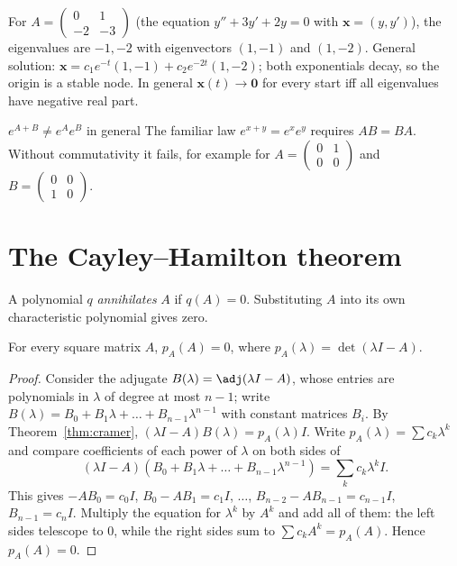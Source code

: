 \begin{example}
For $A=\begin{pmatrix}0&1\\-2&-3\end{pmatrix}$ (the equation $y''+3y'+2y=0$ with $\mathbf{x}=(y,y')$), the eigenvalues are $-1,-2$ with eigenvectors $(1,-1)$ and $(1,-2)$. General solution: $\mathbf{x}=c_1e^{-t}(1,-1)+c_2e^{-2t}(1,-2)$; both exponentials decay, so the origin is a stable node. In general $\mathbf{x}(t)\to\mathbf{0}$ for every start iff all eigenvalues have negative real part.
\end{example}

\begin{pitfall}{$e^{A+B}\ne e^Ae^B$ in general}
The familiar law $e^{x+y}=e^xe^y$ requires $AB=BA$. Without commutativity it fails, for example for $A=\begin{pmatrix}0&1\\0&0\end{pmatrix}$ and $B=\begin{pmatrix}0&0\\1&0\end{pmatrix}$.
\end{pitfall}

\section{The Cayley--Hamilton theorem}

A polynomial $q$ \emph{annihilates} $A$ if $q(A)=0$. Substituting $A$ into its own characteristic polynomial gives zero.

\begin{theorem}\label{thm:ch}
For every square matrix $A$, $p_A(A)=0$, where $p_A(\lambda)=\det(\lambda I-A)$.
\end{theorem}

\begin{proof}
Consider the adjugate $B(\lambda)=\adj(\lambda I-A)$, whose entries are polynomials in $\lambda$ of degree at most $n-1$; write $B(\lambda)=B_0+B_1\lambda+\dots+B_{n-1}\lambda^{n-1}$ with constant matrices $B_i$. By Theorem~\ref{thm:cramer}, $(\lambda I-A)B(\lambda)=p_A(\lambda)I$. Write $p_A(\lambda)=\sum c_k\lambda^k$ and compare coefficients of each power of $\lambda$ on both sides of
\[ (\lambda I-A)(B_0+B_1\lambda+\dots+B_{n-1}\lambda^{n-1})=\sum_kc_k\lambda^kI. \]
This gives $-AB_0=c_0I$, $B_0-AB_1=c_1I$, $\dots$, $B_{n-2}-AB_{n-1}=c_{n-1}I$, $B_{n-1}=c_nI$. Multiply the equation for $\lambda^k$ by $A^k$ and add all of them: the left sides telescope to $0$, while the right sides sum to $\sum c_kA^k=p_A(A)$. Hence $p_A(A)=0$.
\end{proof}

